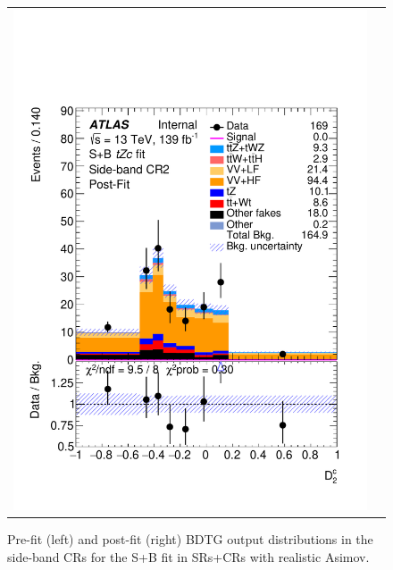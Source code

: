 \begin{figure}[htbp]
\begin{tabular}{cc}
		\includegraphics[width=.45\textwidth]{Appendices/AP9/figures/SPLUSB_CRSR_UsingBaseFullSys/Plots/SBCR2_postFit} \\
	\end{tabular}
	\caption{Pre-fit (left) and post-fit (right) BDTG output distributions in the side-band CRs for the S+B \tZc fit in SRs+CRs with realistic Asimov.
		\ErrStatSys
	}%
	\label{fig:stat:tzc:splusb:crsr:crplots:1_base}
\end{figure}

